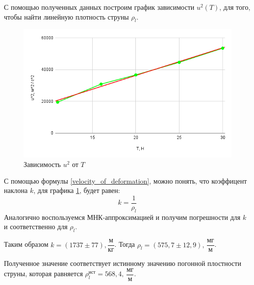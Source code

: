 \documentclass[a4paper, 12pt]{article}
\begin{document}
    \begin{center}
        
    С помощью полученных данных построим график зависимости $u^2(T)$, для того, чтобы найти линейную плотность струны $ \rho_l $. 
	
	\begin{figure}[h!]
		\begin{center}
			\includegraphics[scale=0.8]{chart1.png}
			\caption{Зависимость $ u^2 $ от $ T $}
			\label{chart1}
		\end{center}
	\end{figure}

    \end{center}

    \begin{center}
        
    С помощью формулы \eqref{velocity_of_deformation}, можно понять, что коэффицент наклона $k$, для графика \ref{chart1}, будет равен: $$k = \dfrac{1}{\rho_l}$$ Аналогично воспользуемся МНК-аппроксимацией и получим погрешности для $k$ и соответственно для $\rho_l$.

    \bigskip
    
    Таким образом $k = (1737 \pm 77) {, \dfrac{\text{м}}{\text{кг}}} $.
	Тогда $\rho_l = (575,7 \pm 12,9) \text{, $\dfrac{\text{мг}}{\text{м}}$}$.
    \end{center}

    \newpage

    \begin{center}
        Полученное значение соответствует истинному значению погонной плостности струны, которая равняется $\rho^{\text{ист}}_l = 568,4\text{, $\dfrac{\text{мг}}{\text{м}}$} $.
    \end{center}
\end{document}
